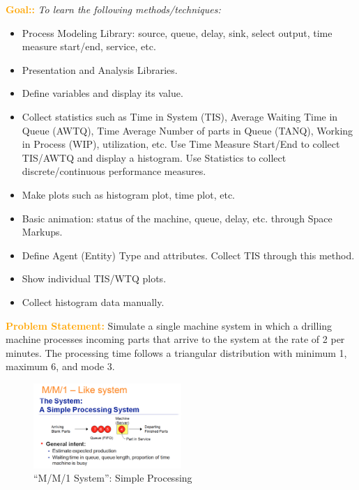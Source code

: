 \documentclass{article}
\begin{document}
\textcolor{orange}{\bf Goal::} \textit{To learn the following methods/techniques:}\\
\begin{itemize}
\item Process Modeling Library: source, queue, delay, sink, select output, time measure start/end, service, etc.
\item Presentation and Analysis Libraries.
\item Define variables and display its value.
\item Collect statistics such as Time in System (TIS), Average Waiting Time in Queue (AWTQ), Time Average Number of parts in Queue (TANQ), Working in Process (WIP), utilization, etc.
Use Time Measure Start/End to collect TIS/AWTQ and display a histogram. Use Statistics to collect discrete/continuous performance measures. 
\item Make plots such as histogram plot, time plot, etc.
\item Basic animation: status of the machine, queue, delay, etc. through Space Markups. 
\item Define Agent (Entity) Type and attributes. Collect TIS through this method. 
\item Show individual TIS/WTQ plots. 
\item Collect histogram data manually.
\end{itemize}


\vskip 0.3in

\textcolor{orange}{\bf Problem Statement:}  Simulate a single machine system in which a drilling machine processes incoming parts that arrive to the system at the rate of 2 per minutes. The processing time follows a triangular distribution with minimum 1, maximum 6, and mode 3.   \\

\begin{figure}[htbp]
\begin{center}
	\includegraphics [width=0.50\textwidth] {mm1.png}
\caption{``M/M/1 System'':  Simple Processing}
\label{fig:sp}
\end{center}
\end{figure}
\end{document}
